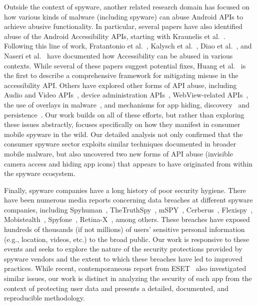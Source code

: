 \documentclass[sigconf,balance=false]{acmart}
\begin{document}
Outside the context of spyware, another related research
domain has focused on how various kinds of malware (including spyware)
can abuse Android APIs to achieve abusive functionality.  In
particular, several papers have also identified abuse of the Android
Accessibility APIs, starting with Kraunelis et
al.~\cite{kraunelis2013malware}.  Following this line of work,
Fratantonio et al.~\cite{fratantonio2017cloak}, Kalysch et
al.~\cite{kalysch2018android}, Diao et al.~\cite{diao2019kindness},
and Naseri et al.~\cite{naseri2019accessileaks} have documented how
Accessibility can be abused in various contexts.  While several of
these papers suggest potential fixes, Huang et
al.~\cite{huang2021a11y} is the first to describe a comprehensive
framework for mitigating misuse in the accessibility API.  Others have
explored other forms of API abuse, including Audio and Video
APIs~\cite{petracca2015audroid, pan2018panoptispy}, device
administration APIs~\cite{shan2019device}, WebView-related APIs~\cite{luo2011attacks, chin2013bifocals, neugschwandtner2013view, ZhangIdentity2022}, the use of overlays in
malware~\cite{yan2019understanding}, and mechanisms for app
hiding, discovery~\cite{shan2018self, pham2019hidemyapp} and
persistence~\cite{zhou2020demystifying}.  Our work builds on all of
these efforts, but rather than exploring these issues abstractly,
focuses specifically on how they manifest in consumer mobile spyware
in the wild.  Our detailed analysis not only confirmed that the consumer spyware sector exploits similar techniques documented in broader mobile malware, but also uncovered two new forms of API
abuse (invisible camera access and hiding app icons) that appears to have originated from within the spyware ecosystem.

Finally, spyware companies have a long history of poor security hygiene. There have been numerous media reports concerning data breaches at different spyware companies, including Spyhuman~\cite{HackerSt66:online}, TheTruthSpy~\cite{Companyt8:online}, mSPY~\cite{mSpybrea38:online,mSpyCybe86:online}, Cerberus~\cite{Cerberus12:online}, Flexispy~\cite{Stalkerw59:online}, Mobistealth~\cite{HackerSt50:online}, Spyfone~\cite{Spywaref13:online}, Retina-X~\cite{RetinaXa98:online, Hackercl62:online}, among others. These breaches have exposed hundreds of thousands (if not millions) of users' sensitive personal information (e.g., location, videos, etc.) to the broad public. Our work is responsive to these events and seeks to explore the nature of the security protections provided by spyware vendors and the extent to which these breaches have led to improved practices. While recent, contemporaneous report from ESET~\cite{esetandr4:online} also investigated similar issues, our work is distinct in analyzing the security of each app from the context of protecting user data and presents a detailed, documented, and reproducible methodology.
\end{document}
